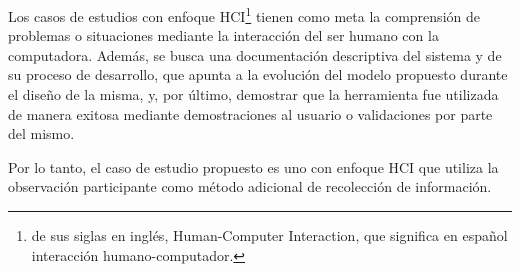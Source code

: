 Los casos de estudios con enfoque HCI\footnote{de sus siglas en inglés, Human-Computer Interaction, que significa en español interacción humano-computador.} tienen como meta la comprensión de problemas o situaciones mediante la interacción del ser humano con la computadora. Además, se busca una documentación descriptiva del sistema y de su proceso de desarrollo, que apunta a la evolución del modelo propuesto durante el diseño de la misma, y, por último, demostrar que la herramienta fue utilizada de manera exitosa mediante demostraciones al usuario o validaciones por parte del mismo\citep{lazar_research_2010}. 

Por lo tanto, el caso de estudio propuesto es uno con enfoque HCI que utiliza la observación participante como método adicional de recolección de información.